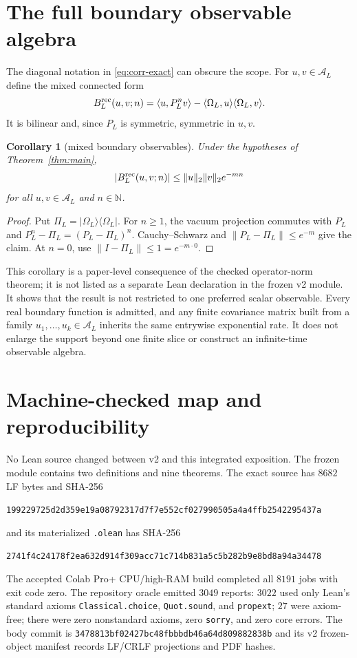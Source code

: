 \documentclass[11pt]{article}
\newtheorem{corollary}[theorem]{Corollary}
\theoremstyle{definition}
\theoremstyle{remark}
\newcommand{\cA}{\mathcal{A}}
\newcommand{\lean}[1]{\nolinkurl{#1}}
\newcommand{\ModuleHash}{\nolinkurl{199229725d2d359e19a08792317d7f7e552cf027990505a4a4ffb2542295437a}}
\newcommand{\OleanHash}{\nolinkurl{2741f4c24178f2ea632d914f309acc71c714b831a5c5b282b9e8bd8a94a34478}}
\begin{document}
\section{The full boundary observable algebra}
\label{sec:observables}

The diagonal notation in \eqref{eq:corr-exact} can obscure the scope.  For
$u,v\in\cA_L$ define the mixed connected form
\[
  B^{\rm rec}_L(u,v;n)
  =\langle u,P_L^nv\rangle
   -\langle\Omega_L,u\rangle\langle\Omega_L,v\rangle.
\]
It is bilinear and, since $P_L$ is symmetric, symmetric in $u,v$.

\begin{corollary}[mixed boundary observables]
\label{cor:mixed}
Under the hypotheses of Theorem~\ref{thm:main},
\[
  |B^{\rm rec}_L(u,v;n)|
  \leq\|u\|_2\|v\|_2e^{-mn}
\]
for all $u,v\in\cA_L$ and $n\in\mathbb N$.
\end{corollary}

\begin{proof}
Put $\Pi_L=|\Omega_L\rangle\langle\Omega_L|$.  For $n\geq1$, the vacuum
projection commutes with $P_L$ and
$P_L^n-\Pi_L=(P_L-\Pi_L)^n$.  Cauchy--Schwarz and
$\|P_L-\Pi_L\|\leq e^{-m}$ give the claim.  At $n=0$, use
$\|I-\Pi_L\|\leq1=e^{-m\cdot0}$.
\end{proof}

This corollary is a paper-level consequence of the checked operator-norm
theorem; it is not listed as a separate Lean declaration in the frozen v2
module.  It shows that the result is not restricted to one preferred scalar
observable.  Every real boundary function is admitted, and any finite
covariance matrix built from a family $u_1,\ldots,u_k\in\cA_L$ inherits the
same entrywise exponential rate.  It does not enlarge the support beyond one
finite slice or construct an infinite-time observable algebra.

\section{Machine-checked map and reproducibility}

No Lean source changed between v2 and this integrated exposition.  The frozen
module contains two definitions and nine theorems.  The exact source has
$8682$ LF bytes and SHA-256
\begin{center}\ModuleHash\end{center}
and its materialized \texttt{.olean} has SHA-256
\begin{center}\OleanHash\end{center}
The accepted Colab Pro+ CPU/high-RAM build completed all $8191$ jobs with exit
code zero.  The repository oracle emitted $3049$ reports: $3022$ used only
Lean's standard axioms \lean{Classical.choice}, \lean{Quot.sound}, and
\lean{propext}; $27$ were axiom-free; there were zero nonstandard axioms, zero
\lean{sorry}, and zero core errors.  The body commit is
\nolinkurl{3478813bf02427bc48fbbbdb46a64d809882838b} and its v2 frozen-object
manifest records LF/CRLF projections and PDF hashes.
\end{document}
